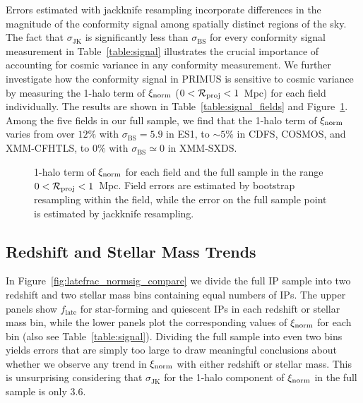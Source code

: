 Errors estimated with jackknife resampling incorporate differences in the magnitude of the conformity signal among spatially distinct regions of the sky.
The fact that $\sigma_{\textrm{JK}}$ is significantly less than $\sigma_{\textrm{BS}}$ for every conformity signal measurement in Table~\ref{table:signal}
illustrates the crucial importance of accounting for cosmic variance in any conformity measurement.
We further investigate how the conformity signal in PRIMUS is sensitive to cosmic variance by measuring the 1-halo term of $\xi_{\textrm{norm}}$ ($0<\mathcal{R}_{\text{proj}}<1$~Mpc) for each field individually.
The results are shown in Table~\ref{table:signal_fields} and Figure~\ref{fig:normsig_fields_1halo}.
Among the five fields in our full sample, we find that the 1-halo term of $\xi_{\textrm{norm}}$ varies from over $12\%$ with $\sigma_{\textrm{BS}}=5.9$ in ES1, to $\sim5\%$ in CDFS, COSMOS, and XMM-CFHTLS, to $0\%$ with $\sigma_{\textrm{BS}}\simeq0$ in XMM-SXDS.

\begin{figure}
  \epstrim{0.4in 0.7in 0.3in 0.3in}
  \caption{
1-halo term of $\xi_{\textrm{norm}}$ for each field and the full sample in the range {$0<\mathcal{R}_{\text{proj}}<1$~Mpc}.
Field errors are estimated by bootstrap resampling within the field, while the error on the full sample point is estimated by jackknife resampling.
}
  \label{fig:normsig_fields_1halo}
\end{figure}



\subsection{Redshift and Stellar Mass Trends}\label{sec:z_mass_bins}

In Figure~\ref{fig:latefrac_normsig_compare} we divide the full IP sample into two redshift and two stellar mass bins containing equal numbers of IPs.
The upper panels show $f_{\textrm{late}}$ for star-forming and quiescent IPs in each redshift or stellar mass bin,
while the lower panels plot the corresponding values of $\xi_{\textrm{norm}}$ for each bin (also see Table~\ref{table:signal}).
Dividing the full sample into even two bins yields errors that are simply too large to draw meaningful conclusions about whether we observe any trend in $\xi_{\textrm{norm}}$ with either redshift or stellar mass.
This is unsurprising considering that $\sigma_{\textrm{JK}}$ for the 1-halo component of $\xi_{\textrm{norm}}$ in the full sample is only 3.6.


